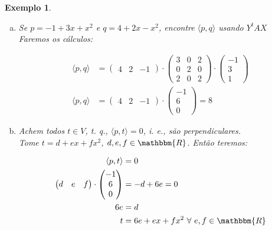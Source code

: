 \documentclass{article}
\newcommand{\REAL} {\mathbbm{R}}
\newcommand{\interno}[2] {\langle #1 , #2\rangle}
\newtheorem{example}{Exemplo}[section]
\begin{document}
\begin{example}
\begin{enumerate}[(a)]
            \item
                Se $p = -1 + 3x + x^2$ e $q = 4 + 2x - x^2$, encontre $\interno{p}{q}$ usando $Y^t A X$\\

                Faremos os cálculos:

                \begin{align*}
                    \interno{p}{q} &= \begin{pmatrix}4&2&-1\end{pmatrix} \cdot
                                                              \begin{pmatrix}
                                                                  3 & 0 & 2\\
                                                                  0 & 2 & 0\\
                                                                  2 & 0 & 2
                                                              \end{pmatrix} \cdot
                                                              \begin{pmatrix}-1\\3\\1\end{pmatrix}\\
                    \interno{p}{q} &= \begin{pmatrix}4&2&-1\end{pmatrix} \cdot \begin{pmatrix}-1\\6\\0\end{pmatrix} = 8
                \end{align*}

            \item
                Achem todos $t \in V$, t. q., $\interno{p}{t} = 0$, i. e., são perpendiculares.\\

                Tome $t = d + ex + fx^2$, $d, e, f \in \REAL$. Então teremos:

                \begin{align*}
                    \interno{p}{t} &= 0\\
                    \begin{pmatrix}d&e&f\end{pmatrix} \cdot \begin{pmatrix}-1\\6\\0\end{pmatrix} &= -d + 6e = 0\\
                    6e &= d\\
                    t &= 6e + ex + fx^2 \text{ }\forall\text{ } e, f \in \REAL
                \end{align*}
        \end{enumerate}
    \end{example}
\end{document}
